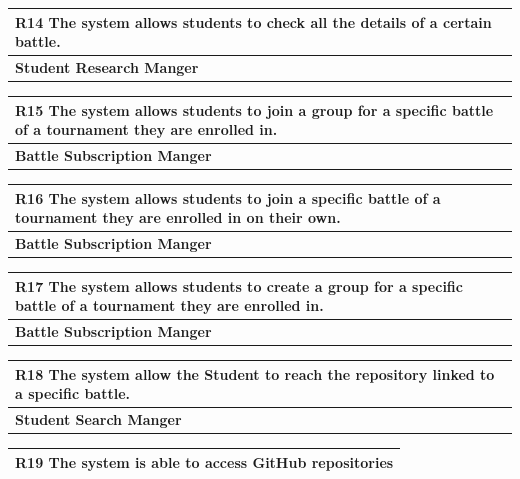 \documentclass[12pt, a4paper]{report}
\begin{document}
\begin{table}[H]
    \begin{tabularx}{\textwidth}{X}
    \textbf{R14} The system allows students to check all the details of a certain battle.\\
    \hline 
    \textbf{Student Research Manger}
\end{tabularx}
\end{table}

\begin{table}[H]
    \begin{tabularx}{\textwidth}{X}
    \textbf{R15} The system allows students to join a group for a specific battle of a
    tournament they are enrolled in.\\
    \hline 
    \textbf{Battle Subscription Manger}
\end{tabularx}
\end{table}

\begin{table}[H]
    \begin{tabularx}{\textwidth}{X}
    \textbf{R16} The system allows students to join a specific battle of a tournament
    they are enrolled in on their own.\\
    \hline 
    \textbf{Battle Subscription Manger}
\end{tabularx}
\end{table}

\begin{table}[H]
    \begin{tabularx}{\textwidth}{X}
    \textbf{R17} The system allows students to create a group for a specific battle of a
    tournament they are enrolled in.\\
    \hline 
    \textbf{Battle Subscription Manger}
\end{tabularx}
\end{table}

\begin{table}[H]
    \begin{tabularx}{\textwidth}{X}
    \textbf{R18} The system allow the Student to reach the repository linked to a specific
    battle.\\
    \hline 
    \textbf{Student Search Manger}
\end{tabularx}
\end{table}

\begin{table}[H]
    \begin{tabularx}{\textwidth}{X}
    \textbf{R19} The system is able to access GitHub repositories\\
    \hline 
    \end{tabularx}
\end{table}
\end{document}
